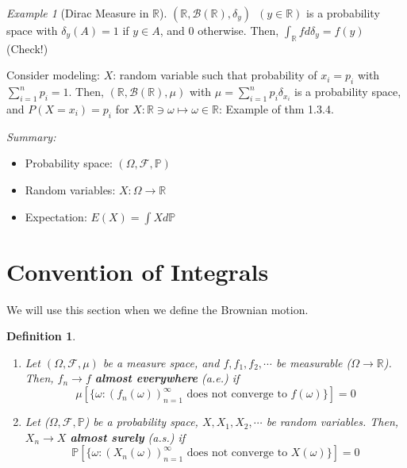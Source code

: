 \documentclass[12pt]{report}
\renewcommand{\1}{\mathbb{1}}
\theoremstyle{break}
\theoremstyle{newdef}
\newtheorem{defn}[thm]{Definition} %
\theoremstyle{remark}
\newtheorem*{exmp}{Example} %
\begin{document}
\begin{exmp}[Dirac Measure in $\mathbb{R}$]
$(\mathbb{R}, \mathcal{B}(\mathbb{R}), \delta_y) \enspace (y \in \mathbb{R})$ is a probability space with $\delta_y(A) = 1$ if $y \in A$, and $0$ otherwise.
Then, $\int_\mathbb{R} fd\delta_y = f(y)$ (Check!)

\vspace{6mm}
Consider modeling: $X$: random variable such that probability of $x_i = p_i$ with $\sum_{i=1}^n p_i = 1$.
Then, $(\mathbb{R}, \mathcal{B}(\mathbb{R}), \mu)$ with $\mu = \sum_{i=1}^n p_i\delta_{x_i}$ is a probability space, and $P(X = x_i) = p_i$ for $X : \mathbb{R} \ni \omega \mapsto \omega \in \mathbb{R}$: Example of thm 1.3.4.
\end{exmp}


\textit{Summary:}
\begin{itemize}
\item Probability space: $(\Omega, \mathcal{F}, \mathbb{P})$
\item Random variables: $X: \Omega \rightarrow \mathbb{R}$
\item Expectation: $E(X) = \int Xd\mathbb{P}$
\end{itemize}





\section{Convention of Integrals}
We will use this section when we define the Brownian motion.
\begin{defn}
\leavevmode
\vspace{-6mm}
\begin{enumerate}[label = (\arabic*)]
\item
Let $(\Omega, \mathcal{F}, \mu)$ be a measure space, and
$f, f_1, f_2, \cdots$ be measurable ($\Omega \rightarrow \mathbb{R}$).
Then, $f_n \rightarrow f$ \textbf{almost everywhere} (a.e.) if
$$
\mu[\{\omega:(f_n(\omega))_{n=1}^\infty \text{ does not converge to } f(\omega)\}] = 0
$$

\item
Let ($\Omega, \mathcal{F}, \mathbb{P}$) be a probability space, $X, X_1, X_2, \cdots$ be random variables.
Then, $X_n \rightarrow X$ \textbf{almost surely} (a.s.) if
$$\mathbb{P}[\{\omega: (X_n(\omega))_{n=1}^\infty \text{ does not converge to } X(\omega)\}] = 0$$
\end{enumerate}
\end{defn}
\end{document}
